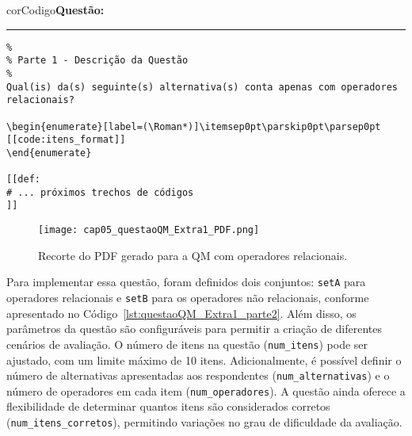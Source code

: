 \begin{listing}[!ht]
    \begin{myboxCode}{corCodigo}{\textbf{Questão: }}\vspace{3mm}
    \hrule
    \begin{verbatim}
%
% Parte 1 - Descrição da Questão
%
Qual(is) da(s) seguinte(s) alternativa(s) conta apenas com operadores relacionais?

\begin{enumerate}[label=(\Roman*)]\itemsep0pt\parskip0pt\parsep0pt
[[code:itens_format]]
\end{enumerate}

[[def:
# ... próximos trechos de códigos
]]
\end{verbatim}
\end{myboxCode}
\caption{Exemplo de QM paramétrica de operadores relacionais -- Parte 1: Descrição de questão.}
\label{lst:questaoQM_Extra1_parte1}
\end{listing}

\begin{figure}[!ht]
    \texttt{[image: cap05\_questaoQM\_Extra1\_PDF.png]}
    \caption{Recorte do PDF gerado para a QM com operadores relacionais.}
    \label{fig:questaoQM_Extra1_PDF}
\end{figure}

Para implementar essa questão, foram definidos dois conjuntos: \verb|setA| para operadores relacionais e \verb|setB| para os operadores não relacionais, conforme apresentado no Código~\ref{lst:questaoQM_Extra1_parte2}. Além disso, os parâmetros da questão são configuráveis para permitir a criação de diferentes cenários de avaliação. O número de itens na questão (\verb|num_itens|) pode ser ajustado, com um limite máximo de 10 itens. Adicionalmente, é possível definir o número de alternativas apresentadas aos respondentes (\verb|num_alternativas|) e o número de operadores em cada item (\verb|num_operadores|). A questão ainda oferece a flexibilidade de determinar quantos itens são considerados corretos (\verb|num_itens_corretos|), permitindo variações no grau de dificuldade da avaliação.



